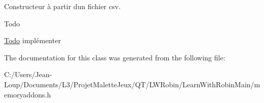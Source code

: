 Constructeur à partir d\textquotesingle{}un fichier csv. 

\begin{DoxyRefDesc}{Todo}
\item[\hyperlink{todo__todo000008}{Todo}]implémenter \end{DoxyRefDesc}


The documentation for this class was generated from the following file\+:\begin{DoxyCompactItemize}
\item 
C\+:/\+Users/\+Jean-\/\+Loup/\+Documents/\+L3/\+Projet\+Malette\+Jeux/\+Q\+T/\+L\+W\+Robin/\+Learn\+With\+Robin\+Main/memoryaddons.\+h\end{DoxyCompactItemize}
